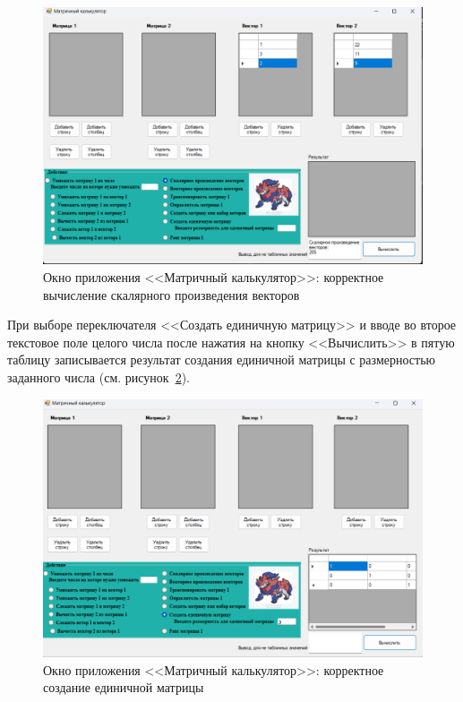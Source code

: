 \documentclass[bachelor, och, pract, times]{SCWorks}
\begin{document}
\begin{figure}[H]
    \centering
    \includegraphics[scale=0.4]{Скрины/Снимок экрана 2025-01-05 133451.png}
    \caption{Окно приложения <<Матричный калькулятор>>: корректное вычисление скалярного произведения векторов}\label{fig:matrix-08}
\end{figure}

При выборе переключателя <<Создать единичную матрицу>> и вводе во второе текстовое поле целого числа после нажатия на кнопку <<Вычислить>> в пятую таблицу записывается результат создания единичной матрицы с размерностью заданного числа (см. рисунок~\ref{fig:matrix-05}).

\begin{figure}[H]
    \centering
    \includegraphics[scale=0.4]{Скрины/Снимок экрана 2025-01-05 131824.png}
    \caption{Окно приложения <<Матричный калькулятор>>: корректное создание единичной матрицы}\label{fig:matrix-05}
\end{figure}
\end{document}
